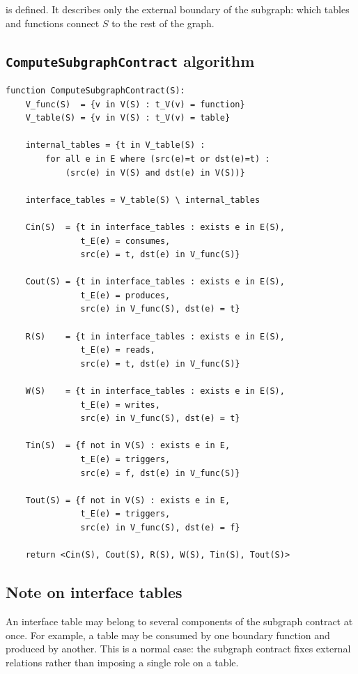 is defined. It describes only the external boundary of the subgraph: which tables and functions connect $S$ to the rest of the graph.

\subsection{\texttt{ComputeSubgraphContract} algorithm}

\begin{lstlisting}
function ComputeSubgraphContract(S):
    V_func(S)  = {v in V(S) : t_V(v) = function}
    V_table(S) = {v in V(S) : t_V(v) = table}

    internal_tables = {t in V_table(S) :
        for all e in E where (src(e)=t or dst(e)=t) :
            (src(e) in V(S) and dst(e) in V(S))}

    interface_tables = V_table(S) \ internal_tables

    Cin(S)  = {t in interface_tables : exists e in E(S),
               t_E(e) = consumes,
               src(e) = t, dst(e) in V_func(S)}

    Cout(S) = {t in interface_tables : exists e in E(S),
               t_E(e) = produces,
               src(e) in V_func(S), dst(e) = t}

    R(S)    = {t in interface_tables : exists e in E(S),
               t_E(e) = reads,
               src(e) = t, dst(e) in V_func(S)}

    W(S)    = {t in interface_tables : exists e in E(S),
               t_E(e) = writes,
               src(e) in V_func(S), dst(e) = t}

    Tin(S)  = {f not in V(S) : exists e in E,
               t_E(e) = triggers,
               src(e) = f, dst(e) in V_func(S)}

    Tout(S) = {f not in V(S) : exists e in E,
               t_E(e) = triggers,
               src(e) in V_func(S), dst(e) = f}

    return <Cin(S), Cout(S), R(S), W(S), Tin(S), Tout(S)>
\end{lstlisting}

\subsection{Note on interface tables}

An interface table may belong to several components of the subgraph contract at once. For example, a table may be consumed by one boundary function and produced by another. This is a normal case: the subgraph contract fixes external relations rather than imposing a single role on a table.

